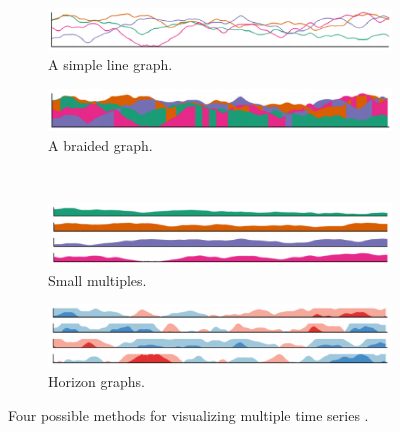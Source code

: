 \begin{figure}
	\centering
	\begin{subfigure}[b]{0.45\textwidth}
		\includegraphics[width=\textwidth]{figures/eps/ts_simplelinegraph.eps}
		\caption{A simple line graph.}
		\label{fig:ts_simple}
	\end{subfigure}
	\begin{subfigure}[b]{0.45\textwidth}
		\includegraphics[width=\textwidth]{figures/eps/ts_braidedgraph.eps}
		\caption{A braided graph.}
		\label{fig:ts_braid}
	\end{subfigure}
	\\
	\begin{subfigure}[b]{0.45\textwidth}
		\includegraphics[width=\textwidth]{figures/eps/ts_smallmultiples.eps}
		\caption{Small multiples.}
		\label{fig:ts_smmult}
	\end{subfigure}
	\begin{subfigure}[b]{0.45\textwidth}
		\includegraphics[width=\textwidth]{figures/eps/ts_horizongraphs.eps}
		\caption{Horizon graphs.}
		\label{fig:ts_horizon}
	\end{subfigure}
	\caption{Four possible methods for visualizing multiple time series \cite{javed2010}.}
	\label{fig:ts_compare}
\end{figure}

